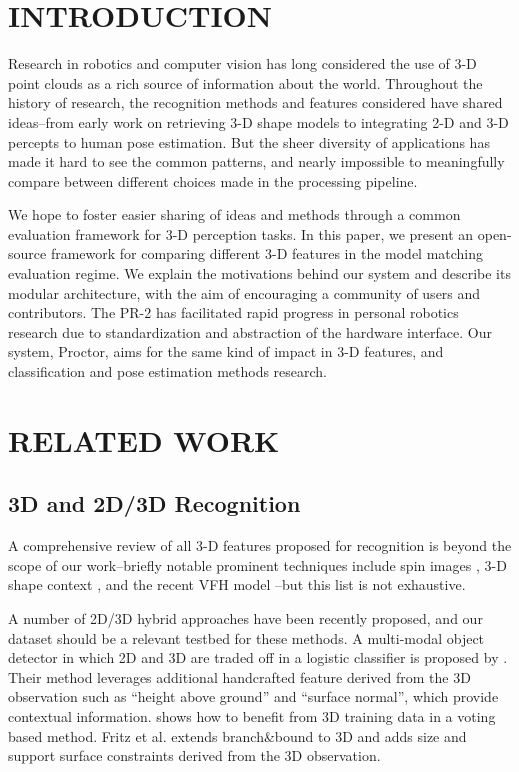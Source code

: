 
\section{INTRODUCTION}
Research in robotics and computer vision has long considered the use of 3-D point clouds as a rich source of information about the world.
Throughout the history of research, the recognition methods and features considered have shared ideas--from early work on retrieving 3-D shape models to integrating 2-D and 3-D percepts to human pose estimation.
But the sheer diversity of applications has made it hard to see the common patterns, and nearly impossible to meaningfully compare between different choices made in the processing pipeline.

We hope to foster easier sharing of ideas and methods through a common evaluation framework for 3-D perception tasks.
In this paper, we present an open-source framework for comparing different 3-D features in the model matching evaluation regime.
We explain the motivations behind our system and describe its modular architecture, with the aim of encouraging a community of users and contributors.
The PR-2  has facilitated rapid progress in personal robotics research due to standardization and abstraction of the hardware interface.
Our system, Proctor, aims for the same kind of impact in 3-D features, and classification and pose estimation methods research.

\section{RELATED WORK}

\subsection{3D and 2D/3D Recognition}
\label{sec:2d-3d}
A comprehensive review of all 3-D features proposed for recognition is beyond the scope of our work--briefly notable prominent techniques include spin images \cite{spin}, 3-D shape context \cite{Frome3DSC}, and the recent VFH model \cite{RaduVFH}--but this list is not exhaustive. 

A number of 2D/3D hybrid approaches have been recently proposed, and our dataset should be a relevant testbed for these methods. A multi-modal object detector in which 2D and 3D are traded off in a logistic classifier is proposed by \cite{gould08eccv}. Their method leverages additional handcrafted feature derived from the 3D observation such as ``height above ground'' and ``surface normal'', which provide contextual information.
\cite{Sun2010} shows how to benefit from 3D training data in a voting based method.
Fritz et al. \cite{Fritz2010} extends branch\&bound to 3D and adds size and support surface constraints derived from the 3D observation.

